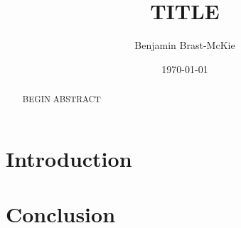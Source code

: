 \documentclass[11pt]{report} %
\begin{document}
\title{TITLE}
\author{Benjamin Brast-McKie}
\date{\today}
\maketitle
\thispagestyle{empty}

\begin{abstract}
\noindent BEGIN ABSTRACT
\end{abstract}

\tableofcontents

\pagebreak


\doublespacing

\section*{Introduction}
%

 

  


\section*{Conclusion}
%











\newpage
\begin{small} %
\singlespacing %
\thispagestyle{empty} %
\end{small} %
\end{document}

